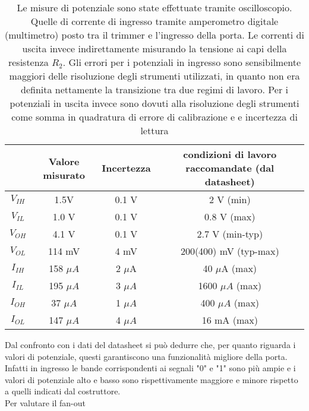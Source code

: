 \begin{table}[h]
	\centering
	\begin{tabular}{*{4}{S[table-figures-exponent = 2]} }
		{} & {Valore misurato} & {Incertezza} & {condizioni di lavoro raccomandate (dal datasheet)} \\
		\midrule
    $V_{IH}$ & 1.5V & 0.1 V & 2 V (min)\\
    $V_{IL}$ & 1.0 V & 0.1 V & 0.8 V (max) \\
    $V_{OH}$ & 4.1 V & 0.1 V & 2.7 V (min-typ)\\
    $V_{OL}$ & 114 mV & 4 mV & 200(400) mV (typ-max)\\
    $I_{IH}$ & 158 $\mu A$ &  2 $\mu$A & 40 $\mu$A (max)\\
    $I_{IL}$ & 195 $\mu A$& 3 $\mu A$ & 1600 $\mu A$ (max)\\
    $I_{OH}$ & 37 $\mu A$& 1 $\mu A$ & 400 $\mu A$ (max)\\
    $I_{OL}$ & 147 $\mu A$& 4 $\mu A$ & 16 mA (max)\\
	
  
 	\end{tabular}
	\caption{ Le misure di potenziale sono state effettuate tramite oscilloscopio. Quelle di corrente di ingresso tramite amperometro digitale (multimetro) posto tra il trimmer e l'ingresso della porta. Le correnti di uscita invece indirettamente misurando la tensione ai capi della resistenza $R_{2}$. Gli errori per i potenziali in ingresso sono sensibilmente maggiori delle risoluzione degli strumenti utilizzati, in quanto non era definita nettamente la transizione tra due regimi di lavoro. Per i potenziali in uscita invece sono dovuti alla risoluzione degli strumenti come somma in quadratura di errore di calibrazione e e incertezza di lettura}
	\label{t:tabella}
\end{table}
Dal confronto con i dati del datasheet si può dedurre che, per quanto riguarda i valori di potenziale, questi garantiscono una funzionalità migliore della porta. Infatti in ingresso le bande corrispondenti ai segnali "0" e "1" sono più ampie e i valori di potenziale alto e basso sono rispettivamente maggiore e minore rispetto a quelli indicati dal costruttore.\\
Per valutare il fan-out
